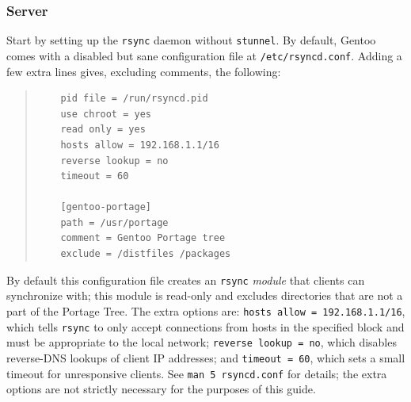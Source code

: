 \documentclass{article}
\begin{document}
\subsubsection{Server}
Start by setting up the \texttt{rsync} daemon without \texttt{stunnel}.  By default, Gentoo comes with a disabled but sane configuration file at \texttt{/etc/rsyncd.conf}.  Adding a few extra lines gives, excluding comments, the following:
\begin{quote}
\begin{verbatim}
	pid file = /run/rsyncd.pid
	use chroot = yes
	read only = yes
	hosts allow = 192.168.1.1/16
	reverse lookup = no
	timeout = 60

	[gentoo-portage]
	path = /usr/portage
	comment = Gentoo Portage tree
	exclude = /distfiles /packages
\end{verbatim}
\end{quote}
By default this configuration file creates an \texttt{rsync} \textit{module} that clients can synchronize with; this module is read-only and excludes directories that are not a part of the Portage Tree.  The extra options are: \texttt{hosts allow = 192.168.1.1/16}, which tells \texttt{rsync} to only accept connections from hosts in the specified block and must be appropriate to the local network; \texttt{reverse lookup = no}, which disables reverse-DNS lookups of client IP addresses; and \texttt{timeout = 60}, which sets a small timeout for unresponsive clients.  See \texttt{man 5 rsyncd.conf} for details; the extra options are not strictly necessary for the purposes of this guide.
\end{document}
